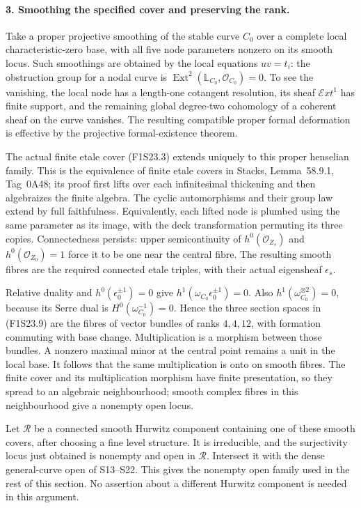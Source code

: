 \paragraph{3. Smoothing the specified cover and preserving the rank.}
Take a proper projective smoothing of the stable curve $C_0$ over
a complete local characteristic-zero base, with all five node
parameters nonzero on its smooth locus. Such smoothings are obtained
by the local equations $uv=t_i$: the obstruction group for a
nodal curve is $\operatorname{Ext}^2(\mathbb L_{C_0},\mathcal O_{C_0})=0$.
To see the vanishing, the local node has a length-one cotangent
resolution, its sheaf $\mathcal Ext^1$ has finite support, and
the remaining global degree-two cohomology of a coherent sheaf
on the curve vanishes. The resulting compatible proper formal
deformation is effective by the projective formal-existence theorem.

The actual finite etale cover (F1S23.3) extends uniquely to this
proper henselian family. This is the equivalence of finite etale
covers in Stacks, Lemma~58.9.1, Tag~0A48; its proof first lifts
over each infinitesimal thickening and then algebraizes the finite
algebra. The cyclic automorphisms and their group law extend by
full faithfulness. Equivalently, each lifted node is plumbed using
the same parameter as its image, with the deck transformation
permuting its three copies. Connectedness persists: upper
semicontinuity of $h^0(\mathcal O_{Z_s})$ and
$h^0(\mathcal O_{Z_0})=1$ force it to be one near the central
fibre. The resulting smooth fibres are the required connected
etale triples, with their actual eigensheaf $\epsilon_s$.

Relative duality and $h^0(\epsilon_0^{\pm1})=0$ give
$h^1(\omega_{C_0}\epsilon_0^{\pm1})=0$. Also
$h^1(\omega_{C_0}^{\otimes2})=0$, because its Serre dual is
$H^0(\omega_{C_0}^{-1})=0$. Hence the three section spaces in
(F1S23.9) are the fibres of vector bundles of ranks $4,4,12$,
with formation commuting with base change. Multiplication is
a morphism between those bundles. A nonzero maximal minor at
the central point remains a unit in the local base. It follows
that the same multiplication is onto on smooth fibres. The finite
cover and its multiplication morphism have finite presentation,
so they spread to an algebraic neighbourhood; smooth complex
fibres in this neighbourhood give a nonempty open locus.

Let $\mathcal R$ be a connected smooth Hurwitz component containing
one of these smooth covers, after choosing a fine level structure.
It is irreducible, and the surjectivity locus just obtained is
nonempty and open in $\mathcal R$. Intersect it with the dense
general-curve open of S13--S22. This gives the nonempty open family
used in the rest of this section. No assertion about a different
Hurwitz component is needed in this argument.


